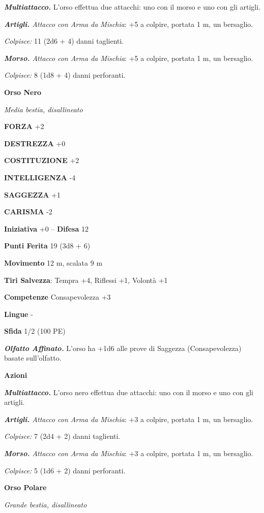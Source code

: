 \begin{multicols}{2}
\emph{\textbf{Multiattacco.}} L'orso effettua due attacchi: uno con il morso e uno con gli artigli.

\emph{\textbf{Artigli.} Attacco con Arma da Mischia}: +5 a colpire, portata 1 m, un bersaglio.

\emph{Colpisce:} 11 (2d6 + 4) danni taglienti.

\emph{\textbf{Morso.} Attacco con Arma da Mischia}: +5 a colpire, portata 1 m, un bersaglio.

\emph{Colpisce:} 8 (1d8 + 4) danni perforanti.

\medskip\textbf{Orso Nero}

\emph{Media bestia, disallineato}

\textbf{FORZA} +2

\textbf{DESTREZZA} +0

\textbf{COSTITUZIONE} +2

\textbf{INTELLIGENZA} -4

\textbf{SAGGEZZA} +1

\textbf{CARISMA} -2

\textbf{Iniziativa} +0 -- \textbf{Difesa} 12

\textbf{Punti Ferita} 19 (3d8 + 6)

\textbf{Movimento} 12 m, scalata 9 m

\textbf{Tiri Salvezza}: Tempra +4, Riflessi +1, Volontà +1 

\textbf{Competenze} Consapevolezza +3

\textbf{Lingue} -

\textbf{Sfida} 1/2 (100 PE)

\emph{\textbf{Olfatto Affinato.}} L'orso ha +1d6 alle prove di Saggezza (Consapevolezza) basate sull'olfatto.

\textbf{Azioni}

\emph{\textbf{Multiattacco.}} L'orso nero effettua due attacchi: uno con il morso e uno con gli artigli.

\emph{\textbf{Artigli.} Attacco con Arma da Mischia}: +3 a colpire, portata 1 m, un bersaglio.

\emph{Colpisce:} 7 (2d4 + 2) danni taglienti.

\emph{\textbf{Morso.} Attacco con Arma da Mischia}: +3 a colpire, portata 1 m, un bersaglio.

\emph{Colpisce:} 5 (1d6 + 2) danni perforanti.

\medskip\textbf{Orso Polare}

\emph{Grande bestia, disallineato}


\end{multicols}
